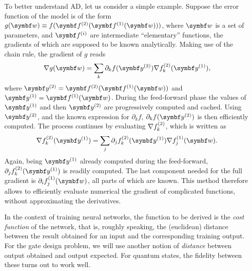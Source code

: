 To better understand \ac{AD}, let us consider a simple example.
Suppose the error function of the model is of the form
$g(\bs w)\equiv f(\bs f^{(2)}(\bs f^{(1)}(\bs w)))$,
where $\bs w$ is a set of parameters, and $\bs f^{(i)}$ are intermediate ``elementary'' functions, the gradients of which are supposed to be known analytically.
Making use of the chain rule, the gradient of $g$ reads
\begin{equation}
\begin{split}
	\grad g(\bs w) =
	\sum_{k} \partial_{k} f(\bs y^{(2)})
	\grad f_{k}^{(2)}(\bs y^{(1)}),
\end{split}
\label{eq:grad_nested_f}
\end{equation}
where $\bs y^{(2)} = \bs f^{(2)}(\bs f^{(1)}(\bs w))$ and
$\bs y^{(1)} = \bs f^{(1)}(\bs w)$.
During the feed-forward phase the values of $\bs y^{(1)}$ and then $\bs y^{(2)}$ are progressively computed and cached.
Using $\bs y^{(2)}$, and the known expression for $\partial_k f$, $\partial_{k} f(\bs y^{(2)})$ is then efficiently computed.
The process continues by evaluating $\nabla f_k^{(2)}$, which is written as
\begin{equation}
	\grad f_k^{(2)}(\bs y^{(1)}) =
	\sum_j \partial_j f_k^{(2)}(\bs y^{(1)}) \grad f_j^{(1)}(\bs w).
\end{equation}
Again, being $\bs y^{(1)}$ already computed during the feed-forward, $\partial_j f_k^{(2)}(\bs y^{(1)})$ is readily computed.
The last component needed for the full gradient is $\partial_i f_j^{(1)}(\bs w)$, all parts of which are known.
This method therefore allows to efficiently evaluate numerical the gradient of complicated functions, without approximating the derivatives.

In the context of training neural networks, the function to be derived is the \emph{cost function} of the network, that is, roughly speaking, the (euclidean) distance between the result obtained for an input and the corresponding training output.
For the gate design problem, we will use another notion of \emph{distance} between output obtained and output expected.
For quantum states, the fidelity between these turns out to work well.

